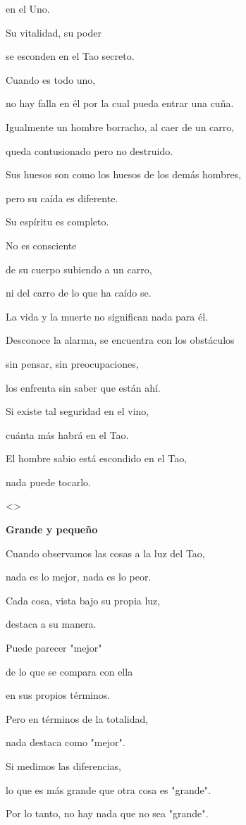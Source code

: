 en el Uno.

Su vitalidad, su poder

se esconden en el Tao secreto.

Cuando es todo uno,

no hay falla en él por la cual pueda entrar una cuña.

Igualmente un hombre borracho, al caer de un carro,

queda contusionado pero no destruido.

Sus huesos son como los huesos de los demás hombres,

pero su caída es diferente.

Su espíritu es completo.

No es consciente

de su cuerpo subiendo a un carro,

ni del carro de lo que ha caído se.

La vida y la muerte no significan nada para él.

Desconoce la alarma, se encuentra con los obstáculos

sin pensar, sin preocupaciones,

los enfrenta sin saber que están ahí.

Si existe tal seguridad en el vino,

cuánta más habrá en el Tao.

El hombre sabio está escondido en el Tao,

nada puede tocarlo.

\textless\textgreater{}

{ }

\textbf{{Grande y pequeño}}

Cuando observamos las cosas a la luz del Tao,

nada es lo mejor, nada es lo peor.

Cada cosa, vista bajo su propia luz,

destaca a su manera.

Puede parecer "mejor"

de lo que se compara con ella

en sus propios términos.

Pero en términos de la totalidad,

nada destaca como "mejor".

Si medimos las diferencias,

lo que es más grande que otra cosa es "grande".

Por lo tanto, no hay nada que no sea "grande".

